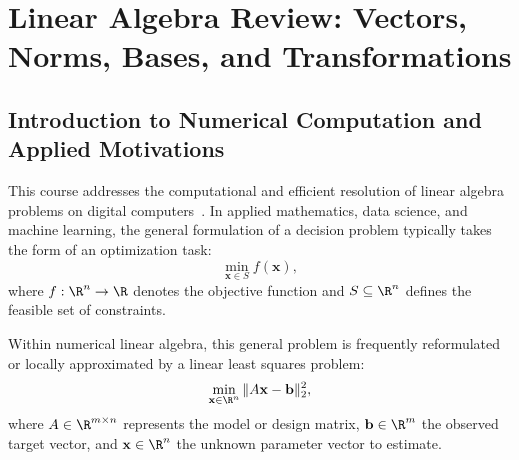 \chapter{Linear Algebra Review: Vectors, Norms, Bases, and Transformations}
\label{chap:linear-algebra-review-vectors-norms}

\FloatBarrier
\section{Introduction to Numerical Computation and Applied Motivations}

This course addresses the computational and efficient resolution of linear algebra problems on digital computers~\cite{trefethen1997numerical,golub2013matrix}. In applied mathematics, data science, and machine learning, the general formulation of a decision problem typically takes the form of an optimization task:
\begin{equation}
    \min_{\mathbf{x} \in S} f(\mathbf{x}),
\end{equation}
where $f: \R^n \to \R$ denotes the objective function and $S \subseteq \R^n$ defines the feasible set of constraints.

Within numerical linear algebra, this general problem is frequently reformulated or locally approximated by a linear least squares problem:
\begin{equation}
    \min_{\mathbf{x} \in \R^n} \|A \mathbf{x} - \mathbf{b}\|_2^2,
\end{equation}
where $A \in \R^{m \times n}$ represents the model or design matrix, $\mathbf{b} \in \R^m$ the observed target vector, and $\mathbf{x} \in \R^n$ the unknown parameter vector to estimate.

